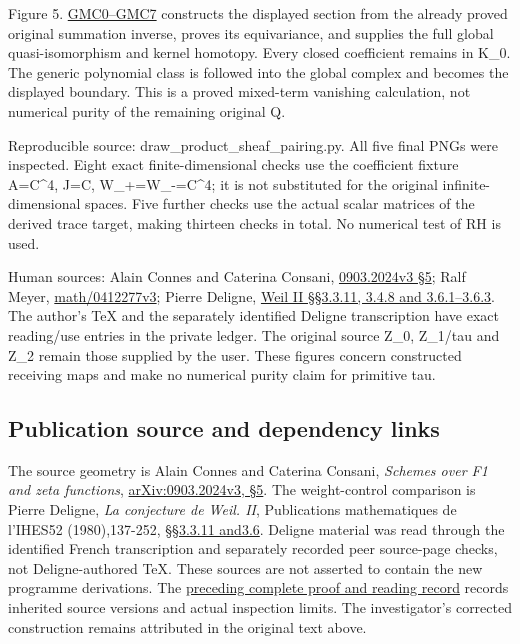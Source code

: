 Figure 5.
\href{https://github.com/KokunoYumeto/zeta-function-research-reader/blob/main/workbenches/splitzero-tandem/continuations/20260925-full-source-tensor-and-original-divisor/counterfactual/GLOBAL_MIXED_RETURN_CONTRACTION.md}{GMC0--GMC7}
constructs the displayed section from the already proved original
summation inverse, proves its equivariance, and supplies the full global
quasi-isomorphism and kernel homotopy. Every closed coefficient remains
in K\_0. The generic polynomial class is followed into the global
complex and becomes the displayed boundary. This is a proved mixed-term
vanishing calculation, not numerical purity of the remaining original Q.

Reproducible source: draw\_product\_sheaf\_pairing.py. All five final
PNGs were inspected. Eight exact finite-dimensional checks use the
coefficient fixture A=C\^{}4, J=C, W\_+=W\_-=C\^{}4; it is not
substituted for the original infinite-dimensional spaces. Five further
checks use the actual scalar matrices of the derived trace target,
making thirteen checks in total. No numerical test of RH is used.

Human sources: Alain Connes and Caterina Consani,
\href{https://arxiv.org/abs/0903.2024v3}{0903.2024v3 §5}; Ralf Meyer,
\href{https://arxiv.org/abs/math/0412277v3}{math/0412277v3}; Pierre
Deligne, \href{https://www.numdam.org/item/PMIHES_1980__52__137_0/}{Weil
II §§3.3.11, 3.4.8 and 3.6.1--3.6.3}. The author's TeX and the
separately identified Deligne transcription have exact reading/use
entries in the private ledger. The original source Z\_0, Z\_1/tau and
Z\_2 remain those supplied by the user. These figures concern
constructed receiving maps and make no numerical purity claim for
primitive tau.

\subsection{Publication source and dependency
links}\label{publication-source-and-dependency-links}

The source geometry is Alain Connes and Caterina Consani, \emph{Schemes
over F1 and zeta functions},
\href{https://arxiv.org/abs/0903.2024v3}{arXiv:0903.2024v3, §5}. The
weight-control comparison is Pierre Deligne, \emph{La conjecture de
Weil. II}, Publications mathematiques de l'IHES52 (1980),137-252,
\href{https://www.numdam.org/item/PMIHES_1980__52__137_0/}{§§3.3.11
and3.6}. Deligne material was read through the identified French
transcription and separately recorded peer source-page checks, not
Deligne-authored TeX. These sources are not asserted to contain the new
programme derivations. The
\href{https://github.com/KokunoYumeto/zeta-function-research-reader/blob/36a82ecca98addb8a98b48204e349737856c7223/workbenches/splitzero-tandem/continuations/20260924-cohomology-weight-and-character-lifts/BUILD_AND_REVIEW.md}{preceding
complete proof and reading record} records inherited source versions and
actual inspection limits. The investigator's corrected construction
remains attributed in the original text above.
